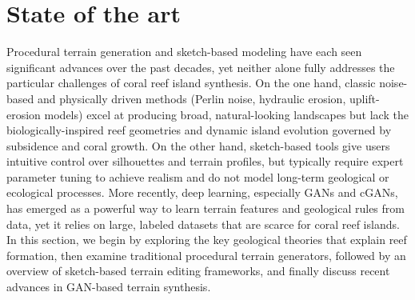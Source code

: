 






\section{State of the art}
\label{sec:coral-island-SotA}

Procedural terrain generation and sketch-based modeling have each seen significant advances over the past decades, yet neither alone fully addresses the particular challenges of coral reef island synthesis. On the one hand, classic noise-based and physically driven methods (Perlin noise, hydraulic erosion, uplift-erosion models) excel at producing broad, natural-looking landscapes but lack the biologically-inspired reef geometries and dynamic island evolution governed by subsidence and coral growth. On the other hand, sketch-based tools give users intuitive control over silhouettes and terrain profiles, but typically require expert parameter tuning to achieve realism and do not model long-term geological or ecological processes. More recently, deep learning, especially GANs and cGANs, has emerged as a powerful way to learn terrain features and geological rules from data, yet it relies on large, labeled datasets that are scarce for coral reef islands. In this section, we begin by exploring the key geological theories that explain reef formation, then examine traditional procedural terrain generators, followed by an overview of sketch-based terrain editing frameworks, and finally discuss recent advances in GAN-based terrain synthesis.


